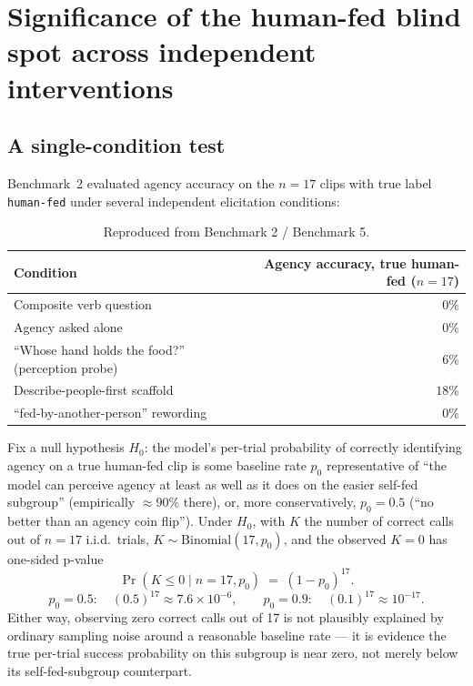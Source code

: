 \section{Significance of the human-fed blind spot across independent interventions}
\label{sec:significance}

\subsection{A single-condition test}

Benchmark~2 evaluated agency accuracy on the $n=17$ clips with true label
\texttt{human-fed} under several independent elicitation conditions:

\begin{table}[h]
\centering
\begin{tabular}{lr}
\toprule
Condition & Agency accuracy, true human-fed ($n=17$) \\
\midrule
Composite verb question                & $0\%$ \\
Agency asked alone                      & $0\%$ \\
``Whose hand holds the food?'' (perception probe) & $6\%$ \\
Describe-people-first scaffold          & $18\%$ \\
``fed-by-another-person'' rewording     & $0\%$ \\
\bottomrule
\end{tabular}
\caption{Reproduced from Benchmark 2 / Benchmark 5.}
\label{tab:agency-conditions}
\end{table}

Fix a null hypothesis $H_0$: the model's per-trial probability of correctly
identifying agency on a true human-fed clip is some baseline rate $p_0$
representative of ``the model can perceive agency at least as well as it
does on the easier self-fed subgroup'' (empirically $\approx 90\%$ there),
or, more conservatively, $p_0 = 0.5$ (``no better than an agency coin
flip''). Under $H_0$, with $K$ the number of correct calls out of $n=17$
i.i.d.\ trials, $K \sim \mathrm{Binomial}(17, p_0)$, and the observed
$K=0$ has one-sided p-value
\[
  \Pr(K \le 0 \mid n=17, p_0) \;=\; (1-p_0)^{17}.
\]
\[
  p_0 = 0.5: \quad (0.5)^{17} \approx 7.6\times 10^{-6}, \qquad
  p_0 = 0.9: \quad (0.1)^{17} \approx 10^{-17}.
\]
Either way, observing zero correct calls out of 17 is not plausibly
explained by ordinary sampling noise around a reasonable baseline rate ---
it is evidence the true per-trial success probability on this subgroup is
near zero, not merely below its self-fed-subgroup counterpart.

